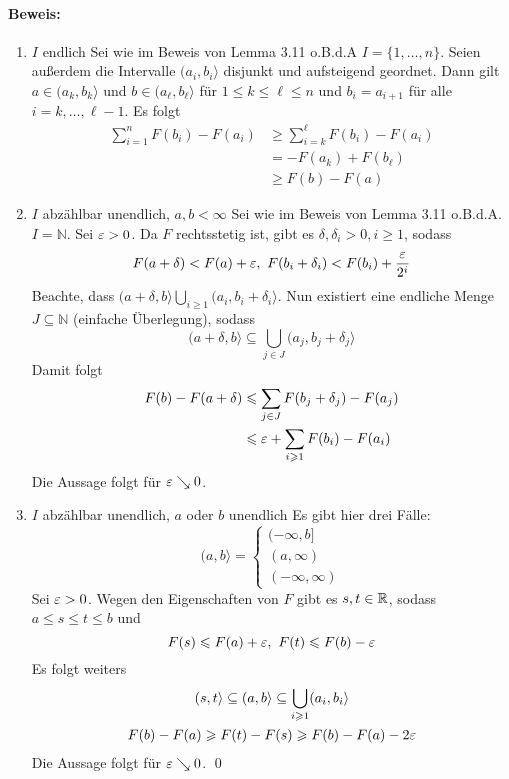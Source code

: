 \documentclass[12pt]{report}
\begin{document}
\paragraph{Beweis:}
\begin{enumerate}[label=\Roman*.]
    \item $I$ endlich\newline
    Sei wie im Beweis von Lemma 3.11 o.B.d.A $I=\{1,\hdots,n\}$. Seien au\ss{}erdem die Intervalle $(a_i,b_i\rangle$ disjunkt und aufsteigend geordnet. Dann gilt $a\in(a_k,b_k\rangle$ und $b\in(a_\ell,b_\ell\rangle$ f\"ur $1\leq k\leq\ell\leq n$ und $b_i=a_{i+1}$ f\"ur alle $i=k,\hdots,\ell-1$. Es folgt
    \begin{align*}
        \sum_{i=1}^nF(b_i)-F(a_i)&\geq\sum_{i=k}^\ell F(b_i)-F(a_i)\\
        &=-F(a_k)+F(b_\ell)\\&\geq F(b)-F(a)
    \end{align*}
    \item $I$ abz\"ahlbar unendlich, $a,b<\infty$\newline
    Sei wie im Beweis von Lemma 3.11 o.B.d.A. $I=\mathbb{N}$. Sei $\varepsilon>0$. Da $F$ rechtsstetig ist, gibt es $\delta,\delta_i>0,i\geq1$, sodass
    $$F(a+\delta)<F(a)+\eps,\ F(b_i+\delta_i)<F(b_i)+\frac{\eps}{2^i}$$
    Beachte, dass $(a+\delta,b\rangle\bigcup_{i\geq1}(a_i,b_i+\delta_i\rangle$. Nun existiert eine endliche Menge $J\subseteq\mathbb{N}$ (einfache \"Uberlegung), sodass
    $$(a+\delta,b\rangle\subseteq\bigcup_{j\in J}(a_j,b_j+\delta_j\rangle$$
    Damit folgt
    \begin{align*}
        F(b)-F(a+\delta)&\leqslant\sum_{j\in J}F(b_j+\delta_j)-F(a_j)\\
        &\leqslant\varepsilon+\sum_{i\geqslant1}F(b_i)-F(a_i)
    \end{align*}
    Die Aussage folgt f\"ur $\varepsilon\searrow0$.
    \item $I$ abz\"ahlbar unendlich, $a$ oder $b$ unendlich\newline
    Es gibt hier drei F\"alle:
    $$(a,b\rangle=
    \begin{cases}
        (-\infty,b] \\
        (a,\infty) \\
        (-\infty,\infty)
    \end{cases}$$
    Sei $\varepsilon>0$. Wegen den Eigenschaften von $F$ gibt es $s,t\in\mathbb{R}$, sodass $a\leq s\leq t\leq b$ und 
    $$F(s)\leqslant F(a)+\varepsilon,\ F(t)\leqslant F(b)-\varepsilon$$
    Es folgt weiters
    \begin{gather*}
        (s,t\rangle\subseteq(a,b\rangle\subseteq\bigcup_{i\geqslant1}(a_i,b_i\rangle\\
        F(b)-F(a)\geqslant F(t)-F(s)\geqslant F(b)-F(a)-2\varepsilon
    \end{gather*}
    Die Aussage folgt f\"ur $\varepsilon\searrow0$. \qed
\end{enumerate}
\end{document}
